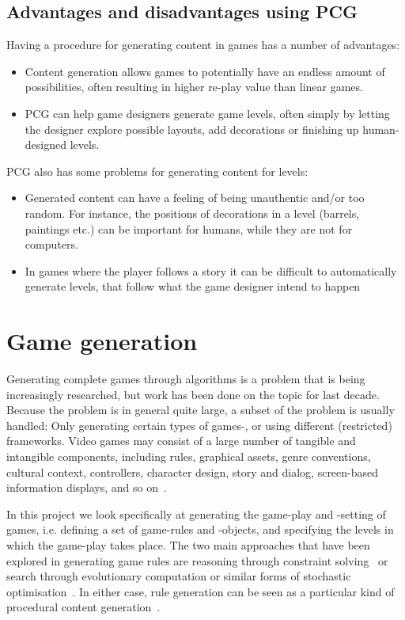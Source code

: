 \documentclass[a4paper,titlepage,final, twoside]{report}
\begin{document}
\subsection{Advantages and disadvantages using PCG}

Having a procedure for generating content in games has a number of advantages:

\begin{itemize}
  \item Content generation allows games to potentially have an endless amount of possibilities, often resulting in higher re-play value than linear games. 
  \item PCG can help game designers generate game levels, often simply by letting the designer explore possible layouts, add decorations or finishing up human-designed levels.
\end{itemize}

PCG also has some problems for generating content for levels:

\begin{itemize}
  \item Generated content can have a feeling of being unauthentic and/or too random. For instance, the positions of decorations in a level (barrels, paintings etc.) can be important for humans, while they are not for computers.
  \item In games where the player follows a story it can be difficult to automatically generate levels, that follow what the game designer intend to happen%
\end{itemize}




\section{Game generation}
Generating complete games through algorithms is a problem that is being increasingly researched, but work has been done on the topic for last decade. Because the problem is in general quite large, a subset of the problem is usually handled: Only generating certain types of games-, or using different (restricted) frameworks. 
Video games may consist of a large number of tangible and intangible components, including rules, graphical assets, genre conventions, cultural context, controllers, character design, story and dialog, screen-based information displays, and so on~\citet{cook2014angelina,liapis2014creativity,nelson2007automated}.

In this project we look specifically at generating the game-play and -setting of games, i.e. defining a set of game-rules and -objects, and specifying the levels in which the game-play takes place.
The two main approaches that have been explored in generating game rules are reasoning through constraint solving~\citet{smith2010variations} or search through evolutionary computation or similar forms of stochastic optimisation~\citet{togelius2008experiment,browne2008automated,font2013towards}. 
In either case, rule generation can be seen as a particular kind of procedural content generation~\citet{pcgbook:ch6}.
\end{document}
